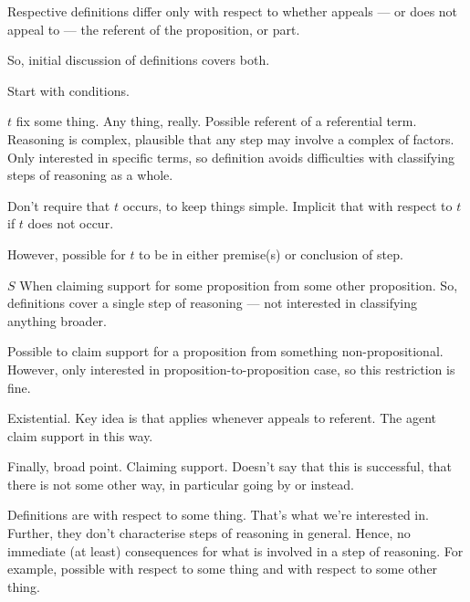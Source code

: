 \begin{note}
  Respective definitions differ only with respect to whether appeals --- or does not appeal to --- the referent of the proposition, or part.

  So, initial discussion of definitions covers both.

  Start with conditions.

  \(t\) fix some thing.
  Any thing, really.
  Possible referent of a referential term.
  Reasoning is complex, plausible that any step may involve a complex of factors.
  Only interested in specific terms, so definition avoids difficulties with classifying steps of reasoning as a whole.

  Don't require that \(t\) occurs, to keep things simple.
  Implicit that \nr{} with respect to \(t\) if \(t\) does not occur.

  However, possible for \(t\) to be in either premise(s) or conclusion of step.

  \(S\)
  When claiming support for some proposition from some other proposition.
  So, definitions cover a single step of reasoning --- not interested in classifying anything broader.

  Possible to claim support for a proposition from something non-propositional.
  However, only interested in proposition-to-proposition case, so this restriction is fine.

  Existential.
  Key idea is that \ur{} applies whenever appeals to referent.
  The agent claim support in this way.

  Finally, broad point.
  Claiming support.
  Doesn't say that this is successful, that there is not some other way, in particular going by \nr{} or \ur{} instead.
\end{note}

\begin{note}[Simpliciter]
  Definitions are with respect to some thing.
  That's what we're interested in.
  Further, they don't characterise steps of reasoning in general.
  Hence, no immediate (at least) consequences for what is involved in a step of reasoning.
  For example, possible \ur{} with respect to some thing and \nr{} with respect to some other thing.
\end{note}

